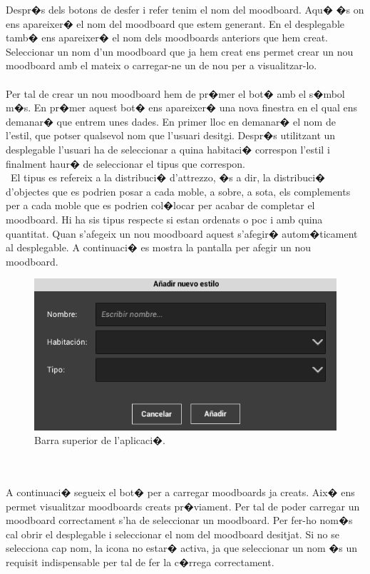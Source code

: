 \documentclass[12pt,a4paper,openright,oneside]{article}
\numberwithin{equation}{section}
\theoremstyle{definition}
\begin{document}
Despr�s dels botons de desfer i refer tenim el nom del moodboard. Aqu� �s on ens apareixer� el nom del moodboard que estem generant. En el desplegable tamb� ens apareixer� el nom dels moodboards anteriors que hem creat. Seleccionar un nom d'un moodboard que ja hem creat ens permet crear un nou moodboard amb el mateix o carregar-ne un de nou per a visualitzar-lo. \\\\
Per tal de crear un nou moodboard hem de pr�mer el bot� amb el s�mbol m�s. En pr�mer aquest bot� ens apareixer� una nova finestra en el qual ens demanar� que entrem unes dades. En primer lloc en demanar� el nom de l'estil, que potser qualsevol nom que l'usuari desitgi. Despr�s utilitzant un desplegable l'usuari ha de seleccionar a quina habitaci� correspon l'estil i finalment haur� de seleccionar el tipus que correspon. \\\
El tipus es refereix a la distribuci� d'attrezzo, �s a dir, la distribuci� d'objectes que es podrien posar a cada moble, a sobre, a sota, els complements per a cada moble que es podrien col�locar per acabar de completar el moodboard. Hi ha sis tipus respecte si estan ordenats o poc i amb quina quantitat. Quan s'afegeix un nou moodboard aquest s'afegir� autom�ticament al desplegable. A continuaci� es mostra la pantalla per afegir un nou moodboard.
\begin{figure}[h!]
\begin{center}
\includegraphics[width=\textwidth]{name}
\caption{Barra superior de l'aplicaci�.}
\end{center}
\end{figure}
\\\\
A continuaci� segueix el bot� per a carregar moodboards ja creats. Aix� ens permet visualitzar moodboards creats pr�viament. Per tal de poder carregar un moodboard correctament s'ha de seleccionar un moodboard. Per fer-ho nom�s cal obrir el desplegable i seleccionar el nom del moodboard desitjat. Si no se selecciona cap nom, la icona no estar� activa, ja que seleccionar un nom �s un requisit indispensable per tal de fer la c�rrega correctament. \\\\
\end{document}
